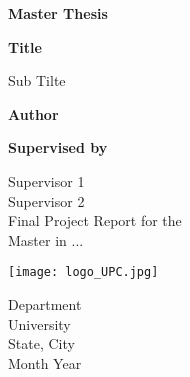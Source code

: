 \begin{titlepage}
    \begin{center}
        \large
        \textbf{Master Thesis\\}
        
        \huge
        \vspace{1cm}
        \textbf{Title\\}
        
        \Large
        \vspace{0.5cm}
        Sub Tilte\\
        
        \vspace{1cm}
        
        \textbf{Author\\}
        
        \vspace{1.5cm}
        
        \textbf{Supervised by\\}
        
        Supervisor 1\\
        Supervisor 2\\
        \Large
        \vfill
        Final Project Report for the\\
        Master in ...
        
        \vspace{0.8cm}
        
        \texttt{[image: logo\_UPC.jpg]}
        
        \vspace{0.8cm}
        Department\\
        University\\
        State, City\\
        Month Year
    \end{center}
\end{titlepage}